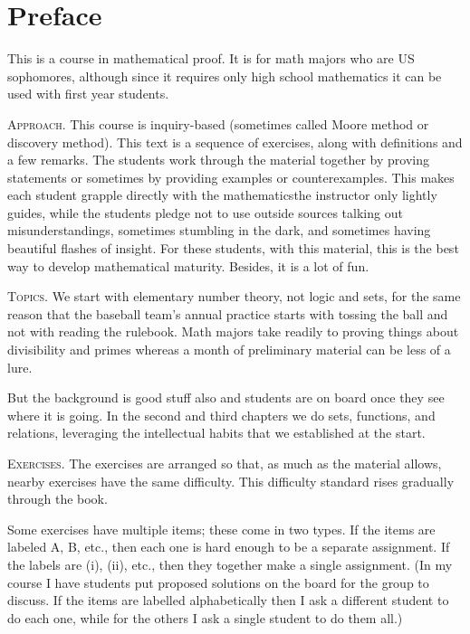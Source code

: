 \chapter*{Preface}

This is a course in mathematical proof. 
It is for math majors who are US sophomores, although since
it requires only high school mathematics
it can be used with first year students.



\medskip
\noindent\textsc{Approach.}
This course is inquiry-based (sometimes called Moore method 
or discovery method).
This text is a sequence of exercises,
along with definitions and a few remarks.
The students work through the material together by
proving statements or sometimes by providing examples or counterexamples.
This makes each student grapple directly with the 
mathematics\Dash the instructor only 
lightly guides, while the students pledge not to use outside sources\Dash
talking out misunderstandings, 
sometimes stumbling in the dark, and sometimes
having beautiful flashes of insight.
For these students, with this material,
this is the best way to develop mathematical maturity.
Besides, it is a lot of fun.


\medskip
\noindent\textsc{Topics.}
We start with elementary number theory, not logic and sets, 
for the same reason
that the baseball team's annual practice starts with tossing the ball and 
not with reading the rulebook.
Math majors take readily to proving things about
divisibility and primes 
whereas a month of preliminary material can be less of a lure.

But the background is good stuff also and 
students are on board once they see where it is going.
In the second and third chapters we do
sets, functions, and relations, leveraging the
intellectual habits that we established at the start.



\medskip
\noindent\textsc{Exercises.}
The exercises are arranged so that, as much as the material allows,
nearby exercises have the same difficulty.
This difficulty standard rises gradually through the book.

Some exercises have multiple items; these come in two types.
If the items are labeled \textsc{A}, \textsc{B}, etc., 
then each one is hard enough to be a separate assignment.
If the labels are (i), (ii), etc., then they together make
a single assignment.
(In my course I have students put proposed solutions on the board
for the group to discuss.
If the items are labelled alphabetically then I ask a different student
to do each one, while for the others I ask a single student to do them all.)



